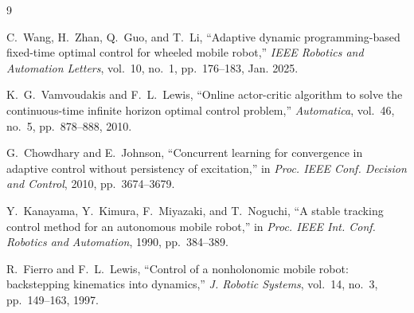 \documentclass[12pt,a4paper]{article}
\begin{document}
\begin{thebibliography}{9}

C.~Wang, H.~Zhan, Q.~Guo, and T.~Li,
``Adaptive dynamic programming-based fixed-time optimal control for wheeled mobile robot,''
\textit{IEEE Robotics and Automation Letters}, vol.~10, no.~1, pp.~176--183, Jan. 2025.

K.~G.~Vamvoudakis and F.~L.~Lewis,
``Online actor-critic algorithm to solve the continuous-time infinite horizon optimal control problem,''
\textit{Automatica}, vol.~46, no.~5, pp.~878--888, 2010.

G.~Chowdhary and E.~Johnson,
``Concurrent learning for convergence in adaptive control without persistency of excitation,''
in \textit{Proc. IEEE Conf. Decision and Control}, 2010, pp.~3674--3679.

Y.~Kanayama, Y.~Kimura, F.~Miyazaki, and T.~Noguchi,
``A stable tracking control method for an autonomous mobile robot,''
in \textit{Proc. IEEE Int. Conf. Robotics and Automation}, 1990, pp.~384--389.

R.~Fierro and F.~L.~Lewis,
``Control of a nonholonomic mobile robot: backstepping kinematics into dynamics,''
\textit{J. Robotic Systems}, vol.~14, no.~3, pp.~149--163, 1997.

\end{thebibliography}
\end{document}
